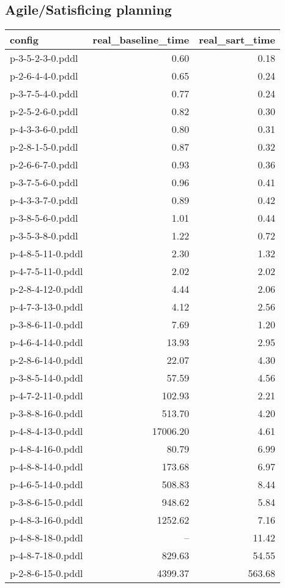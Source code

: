 \documentclass{article}
\begin{document}
                    \subsection*{Agile/Satisficing planning}
                    
                            \begin{center}
                            \scriptsize
                            \begin{tabular}{@{}l|r|r@{}}
                            config & real\_baseline\_time & real\_sart\_time\\\midrule
                             p-3-5-2-3-0.pddl&0.60&0.18\\
 p-2-6-4-4-0.pddl&0.65&0.24\\
 p-3-7-5-4-0.pddl&0.77&0.24\\
 p-2-5-2-6-0.pddl&0.82&0.30\\
 p-4-3-3-6-0.pddl&0.80&0.31\\
 p-2-8-1-5-0.pddl&0.87&0.32\\
 p-2-6-6-7-0.pddl&0.93&0.36\\
 p-3-7-5-6-0.pddl&0.96&0.41\\
 p-4-3-3-7-0.pddl&0.89&0.42\\
 p-3-8-5-6-0.pddl&1.01&0.44\\
 p-3-5-3-8-0.pddl&1.22&0.72\\
 p-4-8-5-11-0.pddl&2.30&1.32\\
 p-4-7-5-11-0.pddl&2.02&2.02\\
 p-2-8-4-12-0.pddl&4.44&2.06\\
 p-4-7-3-13-0.pddl&4.12&2.56\\
 p-3-8-6-11-0.pddl&7.69&1.20\\
 p-4-6-4-14-0.pddl&13.93&2.95\\
 p-2-8-6-14-0.pddl&22.07&4.30\\
 p-3-8-5-14-0.pddl&57.59&4.56\\
 p-4-7-2-11-0.pddl&102.93&2.21\\
 p-3-8-8-16-0.pddl&513.70&4.20\\
 p-4-8-4-13-0.pddl&17006.20&4.61\\
 p-4-8-4-16-0.pddl&80.79&6.99\\
 p-4-8-8-14-0.pddl&173.68&6.97\\
 p-4-6-5-14-0.pddl&508.83&8.44\\
 p-3-8-6-15-0.pddl&948.62&5.84\\
 p-4-8-3-16-0.pddl&1252.62&7.16\\
 p-4-8-8-18-0.pddl&--&11.42\\
 p-4-8-7-18-0.pddl&829.63&54.55\\
 p-2-8-6-15-0.pddl&4399.37&563.68
                            \end{tabular}
                            \end{center}
                    
\end{document}

